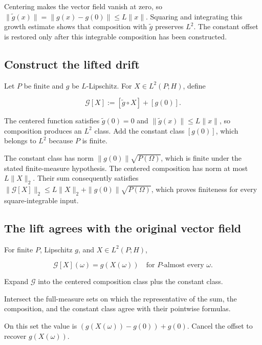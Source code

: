 \documentclass[11pt,a4paper]{report}
\begin{document}
Centering makes the vector field vanish at zero, so \(\|\widetilde g(x)\|=\|g(x)-g(0)\|\le L\|x\|\). Squaring and integrating this growth estimate shows that composition with \(\widetilde g\) preserves \(L^2\). The constant offset is restored only after this integrable composition has been constructed.

\subsection{\texorpdfstring{Construct the lifted drift}{Construct the lifted drift}}
\label{report-step-UnadjustedLangevin-LpDrift-lean-2}


Let \(P\) be finite and \(g\) be \(L\)-Lipschitz. For \(X\in L^2(P;H)\), define

\[\mathcal G[X]:=[\widetilde g\circ X]+[g(0)].\]

The centered function satisfies \(\widetilde g(0)=0\) and \(\|\widetilde g(x)\|\le L\|x\|\), so composition produces an \(L^2\) class. Add the constant class \([g(0)]\), which belongs to \(L^2\) because \(P\) is finite.



The constant class has norm \(\|g(0)\|\sqrt{P(\Omega)}\), which is finite under the stated finite-measure hypothesis. The centered composition has norm at most \(L\|X\|_2\). Their sum consequently satisfies \(\|\mathcal G[X]\|_2\le L\|X\|_2+\|g(0)\|\sqrt{P(\Omega)}\), which proves finiteness for every square-integrable input.

\subsection{\texorpdfstring{The lift agrees with the original vector field}{The lift agrees with the original vector field}}
\label{report-step-UnadjustedLangevin-LpDrift-lean-3}


For finite \(P\), Lipschitz \(g\), and \(X\in L^2(P;H)\),

\[\mathcal G[X](\omega)=g(X(\omega))\quad\text{for }P\text{-almost every }\omega.\]

Expand \(\mathcal G\) into the centered composition class plus the constant class.



Intersect the full-measure sets on which the representative of the sum, the composition, and the constant class agree with their pointwise formulas.



On this set the value is \((g(X(\omega))-g(0))+g(0)\). Cancel the offset to recover \(g(X(\omega))\).
\end{document}

